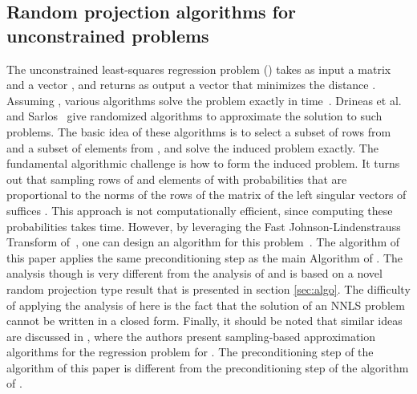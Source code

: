 \documentclass[11pt]{article}
\begin{document}
\subsection{Random projection algorithms for unconstrained  problems}
The unconstrained least-squares regression problem ()
takes as input a matrix  and a
vector , and returns as output a vector
 that minimizes the distance
. Assuming , various algorithms solve the
problem exactly in  time~\cite{GV89}. Drineas et
al.~\cite{DMM06, DMMS07} and Sarlos~\cite{Sar06} give randomized
algorithms to approximate the solution to such problems. The basic
idea of these algorithms is to select a subset of rows from 
and a subset of elements from , and solve the induced problem
exactly. The fundamental algorithmic challenge is how to form the
induced problem. It turns out that sampling rows of  and
elements of  with probabilities that are proportional to the
 norms of the rows of the matrix of the left singular
vectors of  suffices \cite{DMM06}. This approach is not
computationally efficient, since computing these probabilities
takes  time. However, by leveraging the Fast
Johnson-Lindenstrauss Transform of~\cite{AC06}, one can design an
 algorithm for this problem~\cite{DMMS07}. The algorithm
of this paper applies the same preconditioning step as the main
Algorithm of \cite{DMMS07}. The analysis though is very different
from the analysis of \cite{DMMS07} and is based on a novel random
projection type result that is presented in section
\ref{sec:algo}. The difficulty of applying the analysis of
\cite{DMMS07} here is the fact that the solution of an NNLS
problem cannot be written in a closed form. Finally, it should be
noted that similar ideas are discussed in \cite{DDHKM08}, where
the authors present sampling-based approximation algorithms for
the  regression problem for . The
preconditioning step of the algorithm of this paper is different
from the preconditioning step of the algorithm of \cite{DDHKM08}.
\end{document}
